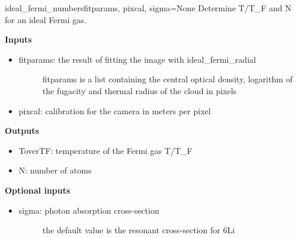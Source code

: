 \documentclass[letterpaper,10pt,english]{manual}
\begin{document}
\hypertarget{odysseus.fitfuncs.ideal_fermi_numbers}{}\begin{funcdesc}{ideal\_fermi\_numbers}{fitparams, pixcal, sigma=None}
Determine T/T\_F and N for an ideal Fermi gas.

\textbf{Inputs}
\begin{itemize}
\item {} \begin{description}
\item[fitparams: the result of fitting the image with ideal\_fermi\_radial] \leavevmode
fitparams is a list containing the central optical density,
logarithm of the fugacity and thermal radius of the cloud in
pixels

\end{description}

\item {} 
pixcal: calibration for the camera in meters per pixel

\end{itemize}

\textbf{Outputs}
\begin{itemize}
\item {} 
ToverTF: temperature of the Fermi gas T/T\_F

\item {} 
N: number of atoms

\end{itemize}

\textbf{Optional inputs}
\begin{itemize}
\item {} \begin{description}
\item[sigma: photon absorption cross-section] \leavevmode
the default value is the resonant cross-section for 6Li

\end{description}

\end{itemize}
\end{funcdesc}
\end{document}
